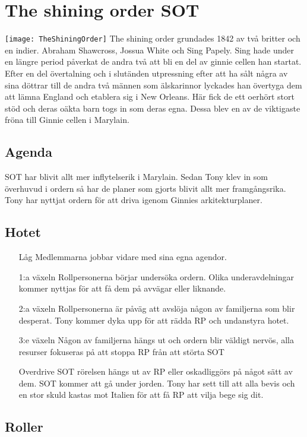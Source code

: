 \documentclass[a5paper,10pt]{report}
\begin{document}
\section{The shining order SOT}
\texttt{[image: TheShiningOrder]}
The shining order grundades 1842 av två britter och en indier. Abraham Shawcross, Jossua White och Sing Papely. Sing hade under en längre period påverkat de andra två att bli en del av ginnie cellen han startat. Efter en del övertalning och i slutänden utpressning efter att ha sålt några av sina döttrar till de andra två männen som älskarinnor lyckades han övertyga dem att lämna England och etablera sig i New Orleans. Här fick de ett oerhört stort stöd och deras oäkta barn togs in som deras egna. Dessa blev en av de viktigaste fröna till Ginnie cellen i Marylain.
\subsection{Agenda}
SOT har blivit allt mer inflytelserik i Marylain. Sedan Tony klev in som överhuvud i ordern så har de planer som gjorts blivit allt mer framgångsrika. Tony har nyttjat ordern för att driva igenom Ginnies arkitekturplaner.
\subsection{Hotet}
\begin{itemize}
  \item[Låg] Medlemmarna jobbar vidare med sina egna agendor.
  \item[1:a växeln] Rollpersonerna börjar undersöka ordern. Olika underavdelningar kommer nyttjas för att få dem på avvägar eller liknande.
  \item[2:a växeln] Rollpersonerna är påväg att avslöja någon av familjerna som blir desperat. Tony kommer dyka upp för att rädda RP och undanstyra hotet.
  \item[3:e växeln] Någon av familjerna hängs ut och ordern blir väldigt nervös, alla resurser fokuseras på att stoppa RP från att störta SOT
  \item[Overdrive] SOT rörelsen hängs ut av RP eller oskadliggörs på något sätt av dem. SOT kommer att gå under jorden. Tony har sett till att alla bevis och en stor skuld kastas mot Italien för att få RP att vilja bege sig dit.
\end{itemize}
\subsection{Roller}
\end{document}
